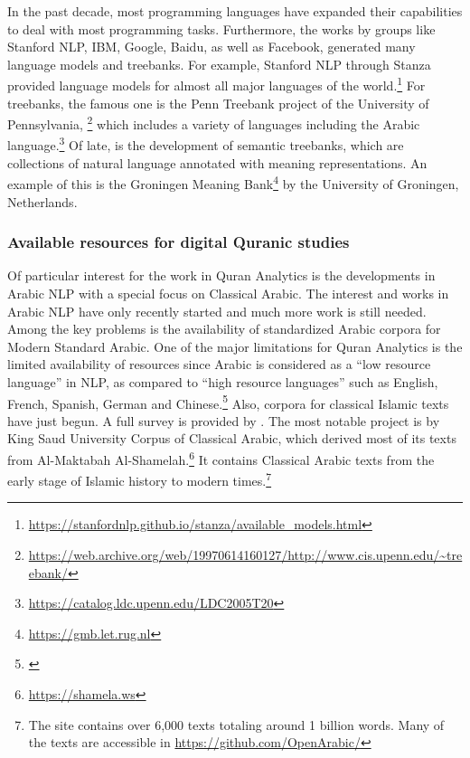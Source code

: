 \documentclass[
]{article}
\begin{document}
In the past decade, most programming languages have expanded their capabilities to deal with most programming tasks. Furthermore, the works by groups like Stanford NLP, IBM, Google, Baidu, as well as Facebook, generated many language models and treebanks. For example, Stanford NLP through Stanza provided language models for almost all major languages of the world.\footnote{\url{https://stanfordnlp.github.io/stanza/available_models.html}} For treebanks, the famous one is the Penn Treebank project of the University of Pennsylvania, \footnote{\url{https://web.archive.org/web/19970614160127/http://www.cis.upenn.edu/~treebank/}} which includes a variety of languages including the Arabic language.\footnote{\url{https://catalog.ldc.upenn.edu/LDC2005T20}} Of late, is the development of semantic treebanks, which are collections of natural language annotated with meaning representations. An example of this is the Groningen Meaning Bank\footnote{\url{https://gmb.let.rug.nl}} by the University of Groningen, Netherlands.

\hypertarget{available-resources-for-digital-quranic-studies}{%
\subsubsection{Available resources for digital Quranic studies}\label{available-resources-for-digital-quranic-studies}}

Of particular interest for the work in Quran Analytics is the developments in Arabic NLP with a special focus on Classical Arabic. The interest and works in Arabic NLP have only recently started and much more work is still needed. Among the key problems is the availability of standardized Arabic corpora for Modern Standard Arabic.\citep{larabi2018} One of the major limitations for Quran Analytics is the limited availability of resources since Arabic is considered as a ``low resource language'' in NLP, as compared to ``high resource languages'' such as English, French, Spanish, German and Chinese.\footnote{\citet{hirschberg2015}} Also, corpora for classical Islamic texts have just begun. A full survey is provided by \citep{atwell2018}. The most notable project is by King Saud University Corpus of Classical Arabic, which derived most of its texts from Al-Maktabah Al-Shamelah.\footnote{\url{https://shamela.ws}} It contains Classical Arabic texts from the early stage of Islamic history to modern times.\footnote{The site contains over 6,000 texts totaling around 1 billion words. Many of the texts are accessible in \url{https://github.com/OpenArabic/}}
\end{document}
